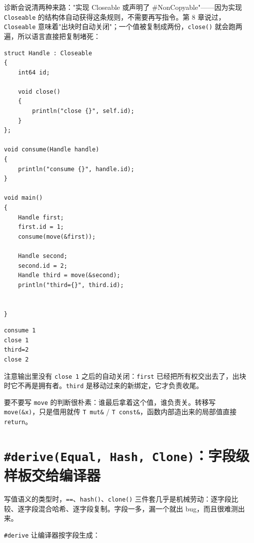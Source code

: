 诊断会说清两种来路："实现 Closeable 或声明了 \#NonCopyable"——因为实现 \texttt{Closeable} 的结构体自动获得这条规则，不需要再写指令。第 8 章说过，\texttt{Closeable} 意味着"出块时自动关闭"；一个值被复制成两份，\texttt{close(\allowbreak{})\allowbreak{}} 就会跑两遍，所以语言直接把复制堵死：

\par
\medskip
\begin{lstlisting}[style=chali]
struct Handle : Closeable
{
    int64 id;

    void close()
    {
        println("close {}", self.id);
    }
};

void consume(Handle handle)
{
    println("consume {}", handle.id);
}

void main()
{
    Handle first;
    first.id = 1;
    consume(move(&first));

    Handle second;
    second.id = 2;
    Handle third = move(&second);
    println("third={}", third.id);


}
\end{lstlisting}
\par
\medskip

\par
\medskip
\begin{lstlisting}[style=out]
consume 1
close 1
third=2
close 2
\end{lstlisting}
\par
\medskip

注意输出里没有 \texttt{close 1} 之后的自动关闭：\texttt{first} 已经把所有权交出去了，出块时它不再是拥有者。\texttt{third} 是移动过来的新绑定，它才负责收尾。

要不要写 \texttt{move} 的判断很朴素：谁最后拿着这个值，谁负责关。转移写 \texttt{move(\allowbreak{}\&x)\allowbreak{}}，只是借用就传 \texttt{T mut\&} / \texttt{T const\&}，函数内部造出来的局部值直接 \texttt{return}。

\section{\texttt{\#derive(\allowbreak{}Equal,\allowbreak{} Hash,\allowbreak{} Clone)\allowbreak{}}：字段级样板交给编译器}

写值语义的类型时，\texttt{=\allowbreak{}=\allowbreak{}}、\texttt{hash(\allowbreak{})\allowbreak{}}、\texttt{clone(\allowbreak{})\allowbreak{}} 三件套几乎是机械劳动：逐字段比较、逐字段混合哈希、逐字段复制。字段一多，漏一个就出 bug，而且很难测出来。

\texttt{\#derive} 让编译器按字段生成：

